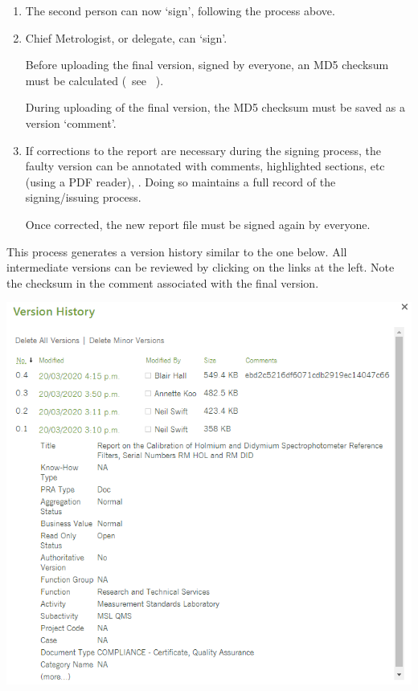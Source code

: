 \begin{enumerate}
\item The second person can now `sign', following the process above.
\item Chief Metrologist, or delegate, can `sign'. 

Before uploading the final version, signed by everyone, an MD5 checksum must be calculated (~see \cite[\S\ref*{GRP-ss:file_integrity_md5}]{MSL_Reporting_Guidelines}~). 

During uploading of the final version, the MD5 checksum must be saved as a version `comment'. 

\item If corrections to the report are necessary during the signing process, the faulty version can be annotated with comments, highlighted sections, etc (using a PDF reader), . Doing so maintains a full record of the signing/issuing process. 

Once corrected, the new report file must be signed again by everyone.
\end{enumerate}

This process generates a version history similar to the one below. All intermediate versions can be reviewed by clicking on the links at the left. Note the checksum in the comment associated with the final version. 

\begin{center}
\includegraphics[scale=.6]{pictures/version_history_report}
\end{center}

